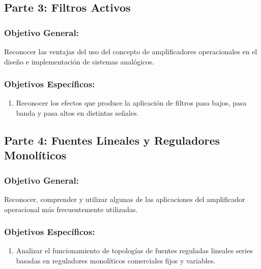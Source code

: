     \subsection*{Parte 3: Filtros Activos}
    
        \subsubsection*{Objetivo General:}
        Reconocer las ventajas del uso del concepto de amplificadores operacionales en el diseño e implementación de sistemas analógicos.
        
        \subsubsection*{Objetivos Específicos:}
        \begin{enumerate}
            \item Reconocer los efectos que produce la aplicación de filtros pasa bajos, pasa banda y pasa altos en distintas señales.
        \end{enumerate}
    
    \subsection*{Parte 4: Fuentes Lineales y Reguladores Monolíticos}
    
        \subsubsection*{Objetivo General:}
        Reconocer, comprender y utilizar algunas de las aplicaciones del amplificador operacional más frecuentemente utilizadas.
        
        \subsubsection*{Objetivos Específicos:}
        \begin{enumerate}
            \item Analizar el funcionamiento de topologías de fuentes reguladas lineales series basadas en reguladores monolíticos comerciales fijos y variables.
        \end{enumerate}
    

\newpage